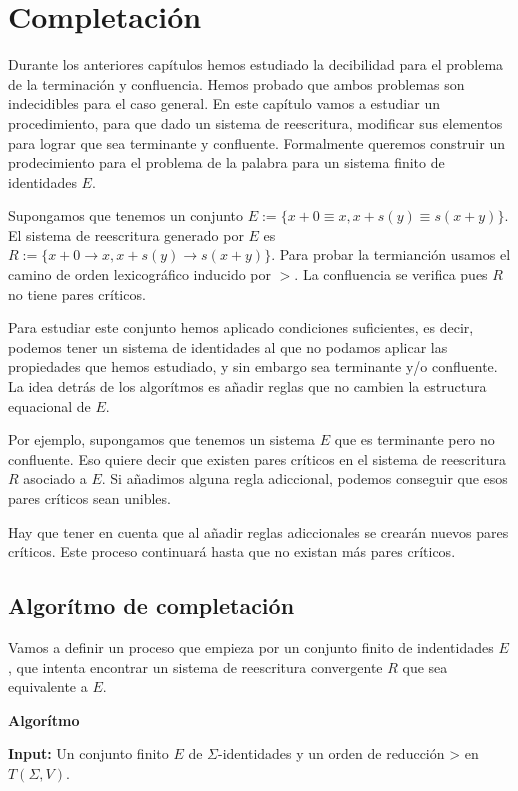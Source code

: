 \chapter{Completación}

Durante los anteriores capítulos hemos estudiado la decibilidad para
el problema de la terminación y confluencia. Hemos probado que ambos
problemas son indecidibles para el caso general. En este capítulo
vamos a estudiar un procedimiento, para que dado un sistema de
reescritura, modificar sus elementos para lograr que sea terminante y
confluente. Formalmente queremos construir un prodecimiento para el
problema de la palabra para un sistema finito de identidades $E$.

Supongamos que tenemos un conjunto
$E := \{ x + 0 \equiv x, x + s(y) \equiv s(x+y) \}$. El sistema de
reescritura generado por $E$ es
$R := \{ x + 0 \rightarrow x, x + s(y) \rightarrow s(x+y)\}$.  Para
probar la termianción usamos el camino de orden lexicográfico inducido
por $>$. La confluencia se verifica pues $R$ no tiene pares críticos.

Para estudiar este conjunto hemos aplicado condiciones suficientes, es
decir, podemos tener un sistema de identidades al que no podamos
aplicar las propiedades que hemos estudiado, y sin embargo sea
terminante y/o confluente. La idea detrás de los algorítmos es añadir
reglas que no cambien la estructura equacional de $E$.

Por ejemplo, supongamos que tenemos un sistema $E$ que es terminante
pero no confluente. Eso quiere decir que existen pares críticos en el
sistema de reescritura $R$ asociado a $E$. Si añadimos alguna regla
adiccional, podemos conseguir que esos pares críticos sean unibles.

Hay que tener en cuenta que al añadir reglas adiccionales se crearán
nuevos pares críticos. Este proceso continuará hasta que no existan
más pares críticos.

\section{Algorítmo de completación}

Vamos a definir un proceso que empieza por un conjunto finito de
indentidades $E$, que intenta encontrar un sistema de reescritura
convergente $R$ que sea equivalente a $E$.

\textbf{Algorítmo} \hrulefill

\textbf{Input:} Un conjunto finito $E$ de $\Sigma$-identidades y un
orden de reducción > en $T(\Sigma, V)$.

